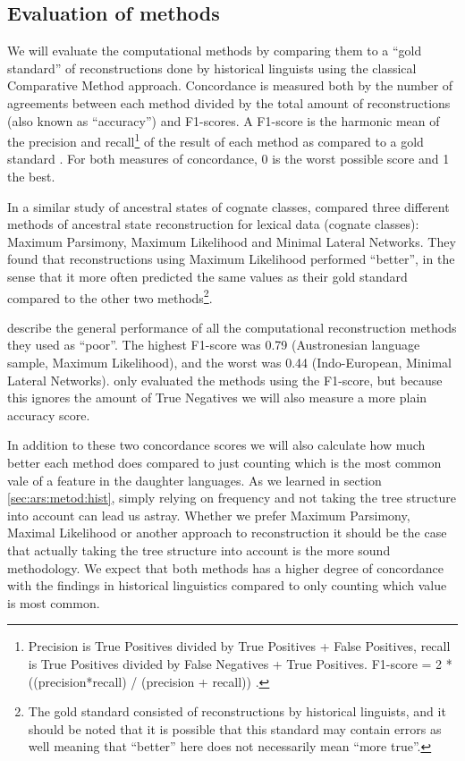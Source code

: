 \documentclass[draft,10pt]{article} %
\begin{document}
\subsection{Evaluation of methods}
We will evaluate the computational methods by comparing them to a ``gold standard'' of reconstructions done by historical linguists using the classical Comparative Method approach. Concordance is measured both by the number of agreements between each method divided by the total amount of reconstructions (also known as ``accuracy'') and F1-scores. A F1-score is the harmonic mean of the precision and recall\footnote{Precision is True Positives divided by True Positives + False Positives, recall is True Positives divided by False Negatives + True Positives. F1-score = 2 * ((precision*recall) / (precision + recall)) \citep{van1979information}.} of the result of each method as compared to a gold standard \citep[133]{van1979information}. For both measures of concordance, 0 is the worst possible score and 1 the best. 

In a similar study of ancestral states of cognate classes, \citet{jager2018using} compared three different methods of ancestral state reconstruction for lexical data (cognate classes): Maximum Parsimony, Maximum Likelihood and Minimal Lateral Networks. They found that reconstructions using Maximum Likelihood performed ``better'', in the sense that it more often predicted the same values as their gold standard compared to the other two methods\footnote{ The gold standard consisted of reconstructions by historical linguists, and it should be noted that it is possible that this standard may contain errors as well meaning that ``better'' here does not necessarily mean ``more true''.}. 

\citet{jager2018using} describe the general performance of all the computational reconstruction methods they used as ``poor''. The highest F1-score was 0.79 (Austronesian language sample, Maximum Likelihood), and the worst was 0.44 (Indo-European, Minimal Lateral Networks). \citet{jager2018using} only evaluated the methods using the F1-score, but because this ignores the amount of True Negatives we will also measure a more plain accuracy score. 

In addition to these two concordance scores we will also calculate how much better each method does compared to just counting which is the most common vale of a feature in the daughter languages. As we learned in section \ref{sec:ars:metod:hist}, simply relying on frequency and not taking the tree structure into account can lead us astray. Whether we prefer Maximum Parsimony, Maximal Likelihood or another approach to reconstruction it should be the case that actually taking the tree structure into account is the more sound methodology. We expect that both methods has a higher degree of concordance with the findings in historical linguistics compared to only counting which value is most common.
\end{document}
